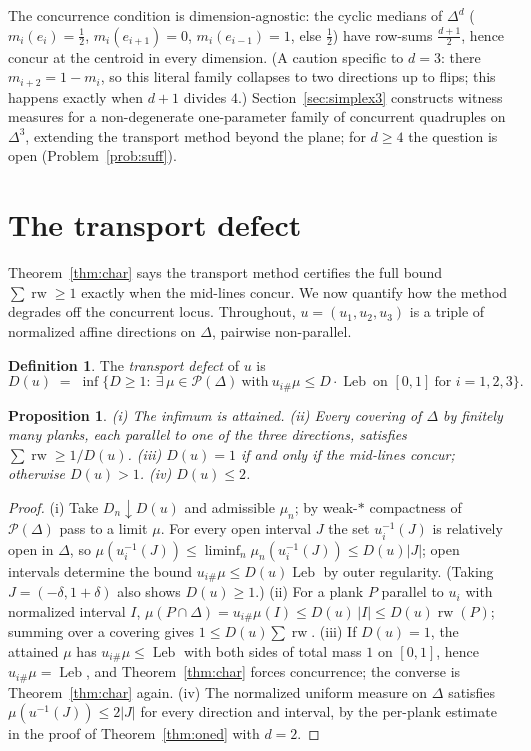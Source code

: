 \documentclass[11pt,reqno]{amsart}
\theoremstyle{plain}
\newtheorem{proposition}[theorem]{Proposition}
\theoremstyle{definition}
\newtheorem{definition}[theorem]{Definition}
\theoremstyle{remark}
\newcommand{\rw}{\operatorname{rw}}
\newcommand{\Leb}{\operatorname{Leb}}
\begin{document}
\smallskip
The concurrence condition is dimension-agnostic: the cyclic medians of $\Delta^d$
($m_i(e_i)=\tfrac12$, $m_i(e_{i+1})=0$, $m_i(e_{i-1})=1$, else $\tfrac12$) have
row-sums $\tfrac{d+1}2$, hence concur at the centroid in every dimension. (A
caution specific to $d=3$: there $m_{i+2}=1-m_i$, so this literal family collapses
to two directions up to flips; this happens exactly when $d+1$ divides $4$.)
Section~\ref{sec:simplex3} constructs witness measures for a non-degenerate
one-parameter family of concurrent quadruples on $\Delta^3$, extending the
transport method beyond the plane; for $d\ge4$ the question is open
(Problem~\ref{prob:suff}).

\section{The transport defect}\label{sec:defect}
Theorem~\ref{thm:char} says the transport method certifies the full bound
$\sum\rw\ge1$ exactly when the mid-lines concur. We now quantify how the method
degrades off the concurrent locus. Throughout, $u=(u_1,u_2,u_3)$ is a triple of
normalized affine directions on $\Delta$, pairwise non-parallel.

\begin{definition}\label{def:defect}
The \emph{transport defect} of $u$ is
\[
D(u)\;=\;\inf\bigl\{D\ge1:\ \exists\,\mu\in\mathcal P(\Delta)\ \text{with}\
u_{i\#}\mu\le D\cdot\Leb\ \text{on }[0,1]\ \text{for }i=1,2,3\bigr\}.
\]
\end{definition}

\begin{proposition}\label{prop:defect}
(i) The infimum is attained. (ii) Every covering of $\Delta$ by finitely many
planks, each parallel to one of the three directions, satisfies
$\sum\rw\ge 1/D(u)$. (iii) $D(u)=1$ if and only if the mid-lines concur;
otherwise $D(u)>1$. (iv) $D(u)\le2$.
\end{proposition}

\begin{proof}
(i) Take $D_n\downarrow D(u)$ and admissible $\mu_n$; by weak-$*$ compactness of
$\mathcal P(\Delta)$ pass to a limit $\mu$. For every open interval $J$ the set
$u_i^{-1}(J)$ is relatively open in $\Delta$, so
$\mu(u_i^{-1}(J))\le\liminf_n\mu_n(u_i^{-1}(J))\le D(u)|J|$; open intervals
determine the bound $u_{i\#}\mu\le D(u)\Leb$ by outer regularity. (Taking
$J=(-\delta,1+\delta)$ also shows $D(u)\ge1$.)
(ii) For a plank $P$ parallel to $u_i$ with normalized interval $I$,
$\mu(P\cap\Delta)=u_{i\#}\mu(I)\le D(u)\,|I|\le D(u)\rw(P)$; summing over a
covering gives $1\le D(u)\sum\rw$.
(iii) If $D(u)=1$, the attained $\mu$ has $u_{i\#}\mu\le\Leb$ with both sides of
total mass $1$ on $[0,1]$, hence $u_{i\#}\mu=\Leb$, and Theorem~\ref{thm:char}
forces concurrence; the converse is Theorem~\ref{thm:char} again.
(iv) The normalized uniform measure on $\Delta$ satisfies
$\mu(u^{-1}(J))\le2|J|$ for every direction and interval, by the per-plank
estimate in the proof of Theorem~\ref{thm:oned} with $d=2$.
\end{proof}
\end{document}
